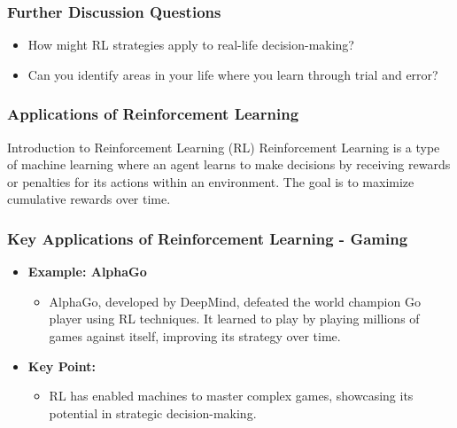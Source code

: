 \documentclass[aspectratio=169]{beamer}
\begin{document}
\begin{frame}[fragile]
    \frametitle{Further Discussion Questions}
    \begin{itemize}
        \item How might RL strategies apply to real-life decision-making?
        \item Can you identify areas in your life where you learn through trial and error?
    \end{itemize}
\end{frame}

\begin{frame}[fragile]
    \frametitle{Applications of Reinforcement Learning}
    \begin{block}{Introduction to Reinforcement Learning (RL)}
        Reinforcement Learning is a type of machine learning where an agent learns to make decisions by receiving rewards or penalties for its actions within an environment. The goal is to maximize cumulative rewards over time.
    \end{block}
\end{frame}

\begin{frame}[fragile]
    \frametitle{Key Applications of Reinforcement Learning - Gaming}
    \begin{itemize}
        \item \textbf{Example: AlphaGo}
        \begin{itemize}
            \item AlphaGo, developed by DeepMind, defeated the world champion Go player using RL techniques. It learned to play by playing millions of games against itself, improving its strategy over time.
        \end{itemize}
        \item \textbf{Key Point:}
        \begin{itemize}
            \item RL has enabled machines to master complex games, showcasing its potential in strategic decision-making.
        \end{itemize}
    \end{itemize}
\end{frame}
\end{document}
